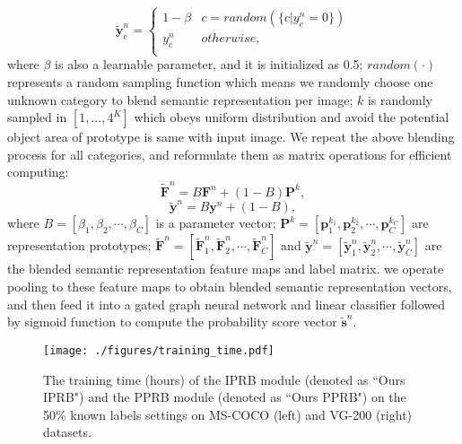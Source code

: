 \documentclass[lettersize,journal]{IEEEtran}
\begin{document}
\begin{equation}
 \tilde{\textbf{y}}^{n}_c=
  \begin{cases}
   1 - \beta & c=random(\{c|y^n_c=0\})\\
   y^{n}_c  & otherwise,\\
  \end{cases}
\end{equation}
where $\beta$ is also a learnable parameter, and it is initialized as 0.5; $random(\cdot)$ represents a random sampling function which means we randomly choose one unknown category to blend semantic representation per image; $k$ is randomly sampled in $[1,...,4^K]$ which obeys uniform distribution and avoid the potential object area of prototype is same with input image. We repeat the above blending process for all categories, and reformulate them as matrix operations for efficient computing: 
\begin{equation}
 {\tilde{\textbf{F}}^{n}} = B \textbf{F}^{n} + (1-B) \textbf{P}^{k},
 \end{equation}
\begin{equation}
 {\tilde{\textbf{y}}^{n}} = B \textbf{y}^n + (1-B),
\end{equation}
where $B=[\beta_1, \beta_2, \cdots, \beta_C]$ is a parameter vector; $\textbf{P}^{k}=[\textbf{p}^{k_1}_1, \textbf{p}^{k_2}_2, \cdots, \textbf{p}^{k_C}_C]$ are representation prototypes; $\tilde{\textbf{F}}^{n}=[\tilde{\textbf{F}}^{n}_1, \tilde{\textbf{F}}^{n}_2, \cdots, \tilde{\textbf{F}}^{n}_C]$ and $\tilde{\textbf{y}}^{n}=[\tilde{\textbf{y}}^{n}_1, \tilde{\textbf{y}}^{n}_2, \cdots, \tilde{\textbf{y}}^{n}_C]$ are the blended semantic representation feature maps and label matrix.  we operate pooling to these feature maps to obtain blended semantic representation vectors, and then feed it into a gated graph neural network and linear classifier followed by sigmoid function to compute the probability score vector $\tilde{\textbf{s}}^{n}$.

\begin{figure}[!h]
   \centering
   \texttt{[image: ./figures/training\_time.pdf]}
   \caption{The training time (hours) of the IPRB module (denoted as ``Ours IPRB") and the PPRB module (denoted as ``Ours PPRB") on the 50\% known labels settings on MS-COCO (left) and VG-200 (right) datasets.}
   \label{fig:training-time}
\end{figure}
\end{document}
